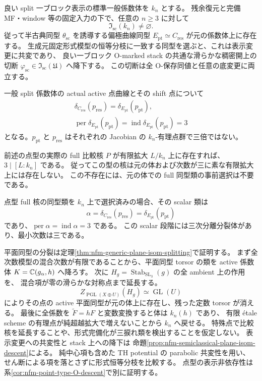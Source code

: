 \begin{maintheorem}
良い split 一ブロック表示の標準一般係数体を $k_n$ とする。
残余復元と完備 MF・window 等の固定入力の下で、任意の $n\ge3$ に対して
\[
 \mathfrak I_{\mathrm{sc}}(k_n)\ne\varnothing.
\]
従って半古典同型 $\theta_{\mathrm{sc}}$ を誘導する偏極曲線同型
$E_{\mathrm{pt}}\simeq C_{\mathrm{res}}$ が元の係数体上に存在する。
生成元固定形式模型の恒等分枝に一致する同型を選ぶと、これは表示変更に共変であり、
良い一ブロック O-marked stack の共通な滑らかな稠密開上の切断
$\varphi_{\mathrm{sc}}\in\mathfrak I_{\mathrm{sc}}(\mathfrak U)$ へ降下する。
この切断は全 O-保存同値と任意の底変更に両立する。

一般 split 係数体の actual active 点曲線とその shift 点について
\[
 \begin{gathered}
 \delta_{C_{\mathrm{res}}}(p_{\mathrm{res}})
   =\delta_{E_{\mathrm{pt}}}(p_{\mathrm{pt}}),\\
 \operatorname{per}\delta_{E_{\mathrm{pt}}}(p_{\mathrm{pt}})
   =\operatorname{ind}\delta_{E_{\mathrm{pt}}}(p_{\mathrm{pt}})=3
 \end{gathered}
\]
となる。$p_{\mathrm{pt}}$ と $p_{\mathrm{res}}$ はそれぞれの Jacobian の
$k_n$-有理点群で三倍ではない。

前述の点型の実際の full 比較核 $P$ が有限拡大 $L/k_n$ 上に存在すれば、
$3\mid[L:k_n]$ である。
従ってこの型の核は元の体および次数が三に素な有限拡大上には存在しない。
この不存在には、元の体での full 同型類の事前選択は不要である。

点型 full 核の同型類を $k_n$ 上で選択済みの場合、その scalar 類は
\[
 \alpha=\delta_{C_{\mathrm{res}}}(p_{\mathrm{res}})
       =\delta_{E_{\mathrm{pt}}}(p_{\mathrm{pt}})
\]
であり、$\operatorname{per}\alpha=\operatorname{ind}\alpha=3$ である。
この scalar 段階には三次分離分裂体があり、最小次数は三である。
\end{maintheorem}

平面同型の分裂は定理\ref{thm:nfm-generic-plane-isom-splitting}で証明する。
まず全次数模型の混合次数が有限であることから、平面同型 torsor の類を
active 係数体 $K=\mathbb C(g_\alpha,h)$ へ降ろす。
次に $H_g=\operatorname{Stab}_{\operatorname{SL}_3}(g)$ の全 ambient 上の作用を、
混合項が零の滑らかな対称点まで延長する。
\[
 Z_{\operatorname{PGL}(X\oplus U)}(H_g)\simeq\operatorname{GL}(U)
\]
によりその点の active 平面同型が元の体上に存在し、残った定数 torsor が消える。
最後に全係数を $\widetilde F=hF$ と変数変換すると体は $k_n(h)$ であり、
有限 \'etale scheme の有理点が純超越拡大で増えないことから $k_n$ へ戻せる。
特殊点で比較核を延長することや、形式完備化が三捩れ類を検出することを仮定しない。
表示変更への共変性と stack 上への降下は
命題\ref{prop:nfm-semiclassical-plane-isom-descent}による。
純中心項も含めた TH potential の parabolic 共変性を用い、
せん断による項を落とさずに形式恒等分枝を比較する。
点型の表示非依存性は系\ref{cor:nfm-point-type-O-descent}で別に証明する。

